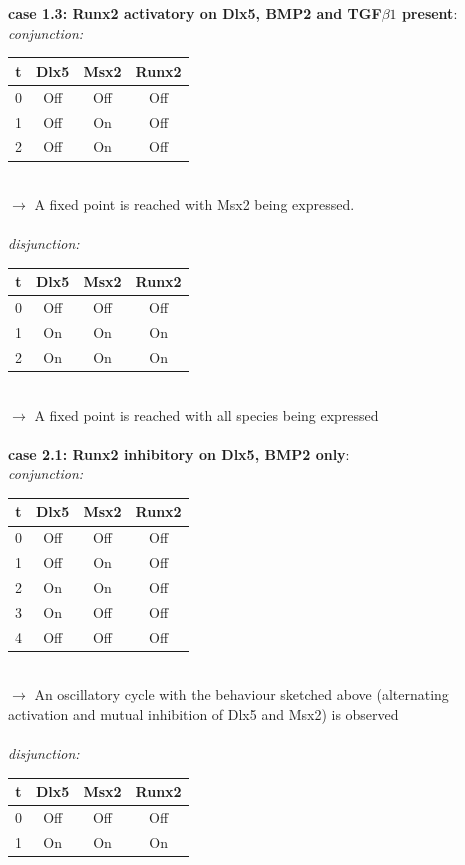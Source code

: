 \documentclass[11pt]{article}
\begin{document}
\begin{appendices}
\\ \\
\textbf{case 1.3: Runx2 activatory on Dlx5, BMP2 and TGF$\beta1$ present}: \\
\textit{conjunction:}
\\ 
\begin{tabular}{c c c c}
t & Dlx5 & Msx2 & Runx2 \\
\hline
0 & Off & Off & Off \\
1 & Off & On & Off \\
2 & Off & On & Off
\end{tabular}
\\
$\rightarrow$ A fixed point is reached with Msx2 being expressed.  
\\ \\
\textit{disjunction:}
\\ 
\begin{tabular}{c c c c}
t & Dlx5 & Msx2 & Runx2 \\
\hline
0 & Off & Off & Off \\
1 & On & On & On \\
2 & On & On & On
\end{tabular}
\\
$\rightarrow$ A fixed point is reached with all species being expressed
\\ \\
\textbf{case 2.1: Runx2 inhibitory on Dlx5, BMP2 only}: \\
\textit{conjunction:}
\\
\begin{tabular}{c c c c}
t & Dlx5 & Msx2 & Runx2 \\
\hline
0 & Off & Off & Off \\
1 & Off & On & Off \\
2 & On & On & Off \\
3 & On & Off & Off \\
4 & Off & Off & Off
\end{tabular}
\\
$\rightarrow$ An oscillatory cycle with the behaviour sketched above (alternating activation and mutual inhibition of Dlx5 and Msx2) is observed 
\\ \\
\textit{disjunction:}
\\ 
\begin{tabular}{c c c c}
t & Dlx5 & Msx2 & Runx2 \\
\hline
0 & Off & Off & Off \\
1 & On & On & On \\

\end{tabular}
\end{appendices}
\end{document}
